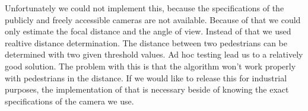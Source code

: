 Unfortunately we could not implement this, because the specifications of the publicly and freely accessible cameras are not available.
Because of that we could only estimate the focal distance and the angle of view. Instead of that we used realtive distance determination.
The distance between two pedestrians can be determined with two given threshold values. Ad hoc testing lead us to a relatively good solution.
The problem with this is that the algorithm won't work properly with pedestrians in the distance. If we would like to release this for
industrial purposes, the implementation of that is necessary beside of knowing the exact specifications of the camera we use.


